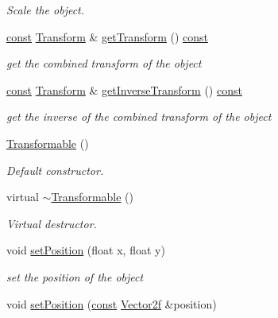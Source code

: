 \begin{DoxyCompactItemize}
\begin{DoxyCompactList}\small\item\em Scale the object. \end{DoxyCompactList}\item 
\hyperlink{term__entry_8h_a57bd63ce7f9a353488880e3de6692d5a}{const} \hyperlink{classsf_1_1_transform}{Transform} \& \hyperlink{classsf_1_1_transformable_a3b48c3362e3e2c14fef7551252deb7bb}{get\-Transform} () \hyperlink{term__entry_8h_a57bd63ce7f9a353488880e3de6692d5a}{const} 
\begin{DoxyCompactList}\small\item\em get the combined transform of the object \end{DoxyCompactList}\item 
\hyperlink{term__entry_8h_a57bd63ce7f9a353488880e3de6692d5a}{const} \hyperlink{classsf_1_1_transform}{Transform} \& \hyperlink{classsf_1_1_transformable_ab00de62b5d1efb2ee4cf2566dea98175}{get\-Inverse\-Transform} () \hyperlink{term__entry_8h_a57bd63ce7f9a353488880e3de6692d5a}{const} 
\begin{DoxyCompactList}\small\item\em get the inverse of the combined transform of the object \end{DoxyCompactList}\item 
\hyperlink{classsf_1_1_transformable_ae71710de0fef423121bab1c684954a2e}{Transformable} ()
\begin{DoxyCompactList}\small\item\em Default constructor. \end{DoxyCompactList}\item 
virtual \hyperlink{classsf_1_1_transformable_a43253abcb863195a673c2a347a7425cc}{$\sim$\-Transformable} ()
\begin{DoxyCompactList}\small\item\em Virtual destructor. \end{DoxyCompactList}\item 
void \hyperlink{classsf_1_1_transformable_a4dbfb1a7c80688b0b4c477d706550208}{set\-Position} (float x, float y)
\begin{DoxyCompactList}\small\item\em set the position of the object \end{DoxyCompactList}\item 
void \hyperlink{classsf_1_1_transformable_af1a42209ce2b5d3f07b00f917bcd8015}{set\-Position} (\hyperlink{term__entry_8h_a57bd63ce7f9a353488880e3de6692d5a}{const} \hyperlink{namespacesf_a80cea3c46537294fd1d8d428566ad8b2}{Vector2f} \&position)

\end{DoxyCompactItemize}
